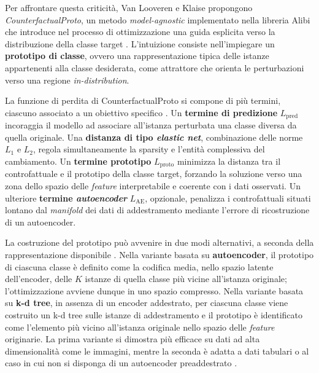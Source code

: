 Per affrontare questa criticità, Van Looveren e Klaise propongono \textit{CounterfactualProto}, un metodo \textit{model-agnostic} implementato nella libreria Alibi che introduce nel processo di ottimizzazione una guida esplicita verso la distribuzione della classe target \cite{vanlooveren2021counterfactualproto}. L'intuizione consiste nell'impiegare un \textbf{prototipo di classe}, ovvero una rappresentazione tipica delle istanze appartenenti alla classe desiderata, come attrattore che orienta le perturbazioni verso una regione \textit{in-distribution}.

La funzione di perdita di CounterfactualProto si compone di più termini, ciascuno associato a un obiettivo specifico \cite{vanlooveren2021counterfactualproto}. Un \textbf{termine di predizione} $L_{\text{pred}}$ incoraggia il modello ad associare all'istanza perturbata una classe diversa da quella originale. Una \textbf{distanza di tipo \textit{elastic net}}, combinazione delle norme $L_1$ e $L_2$, regola simultaneamente la sparsity e l'entità complessiva del cambiamento. Un \textbf{termine prototipo} $L_{\text{proto}}$ minimizza la distanza tra il controfattuale e il prototipo della classe target, forzando la soluzione verso una zona dello spazio delle \textit{feature} interpretabile e coerente con i dati osservati. Un ulteriore \textbf{termine \textit{autoencoder}} $L_{\text{AE}}$, opzionale, penalizza i controfattuali situati lontano dal \textit{manifold} dei dati di addestramento mediante l'errore di ricostruzione di un autoencoder.

La costruzione del prototipo può avvenire in due modi alternativi, a seconda della rappresentazione disponibile \cite{vanlooveren2021counterfactualproto}. Nella variante basata su \textbf{autoencoder}, il prototipo di ciascuna classe è definito come la codifica media, nello spazio latente dell'encoder, delle $K$ istanze di quella classe più vicine all'istanza originale; l'ottimizzazione avviene dunque in uno spazio compresso. Nella variante basata su \textbf{k-d tree}, in assenza di un encoder addestrato, per ciascuna classe viene costruito un k-d tree sulle istanze di addestramento e il prototipo è identificato come l'elemento più vicino all'istanza originale nello spazio delle \textit{feature} originarie. La prima variante si dimostra più efficace su dati ad alta dimensionalità come le immagini, mentre la seconda è adatta a dati tabulari o al caso in cui non si disponga di un autoencoder preaddestrato \cite{vanlooveren2021counterfactualproto}.

